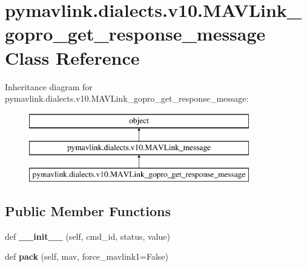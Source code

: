 \hypertarget{classpymavlink_1_1dialects_1_1v10_1_1MAVLink__gopro__get__response__message}{}\section{pymavlink.\+dialects.\+v10.\+M\+A\+V\+Link\+\_\+gopro\+\_\+get\+\_\+response\+\_\+message Class Reference}
\label{classpymavlink_1_1dialects_1_1v10_1_1MAVLink__gopro__get__response__message}
Inheritance diagram for pymavlink.\+dialects.\+v10.\+M\+A\+V\+Link\+\_\+gopro\+\_\+get\+\_\+response\+\_\+message\+:\begin{figure}[H]
\begin{center}
\leavevmode
\includegraphics[height=3.000000cm]{classpymavlink_1_1dialects_1_1v10_1_1MAVLink__gopro__get__response__message}
\end{center}
\end{figure}
\subsection*{Public Member Functions}
\begin{DoxyCompactItemize}
\item 
\mbox{\label{classpymavlink_1_1dialects_1_1v10_1_1MAVLink__gopro__get__response__message_a97f7dd7a3521c36ce0cd67cdebaea1e4}} 
def {\bfseries \+\_\+\+\_\+init\+\_\+\+\_\+} (self, cmd\+\_\+id, status, value)
\item 
\mbox{\label{classpymavlink_1_1dialects_1_1v10_1_1MAVLink__gopro__get__response__message_a7a3fec806657b518a55889993681d0b4}} 
def {\bfseries pack} (self, mav, force\+\_\+mavlink1=False)
\end{DoxyCompactItemize}
